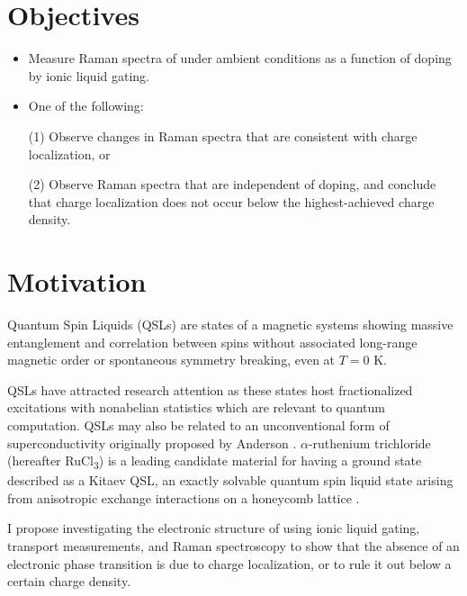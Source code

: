 \documentclass[11pt]{article}
\begin{document}
\begin{multicols}{2}


\section{Objectives}
\begin{itemize}
	\item Measure Raman spectra of \rucl under ambient conditions as a function of doping by ionic liquid gating.
	\item One of the following:
	
	(1) Observe changes in Raman spectra that are consistent with charge localization, or 
	
	(2) Observe Raman spectra that are independent of doping, and conclude that charge localization does not occur below the highest-achieved charge density.
	
\end{itemize}

\section{Motivation}
Quantum Spin Liquids (QSLs) are states of a magnetic systems showing massive entanglement and correlation between spins without associated long-range magnetic order or spontaneous symmetry breaking, even at $T = 0$ K. 

QSLs have attracted research attention as these states host fractionalized excitations with nonabelian statistics \cite{Balents2010} which are relevant to quantum computation. QSLs may also be related to an unconventional form of superconductivity originally proposed by Anderson \cite{Lee2008}. $\alpha$-ruthenium trichloride (hereafter RuCl\textsubscript{3}) is a leading candidate material for having a ground state described as a Kitaev QSL, an exactly solvable quantum spin liquid state arising from anisotropic exchange interactions on a honeycomb lattice \cite{Kitaev2006}.

I propose investigating the electronic structure of \rucl using ionic liquid gating, transport measurements, and Raman spectroscopy to show that the absence of an electronic phase transition is due to charge localization, or to rule it out below a certain charge density.


\end{multicols}
\end{document}
